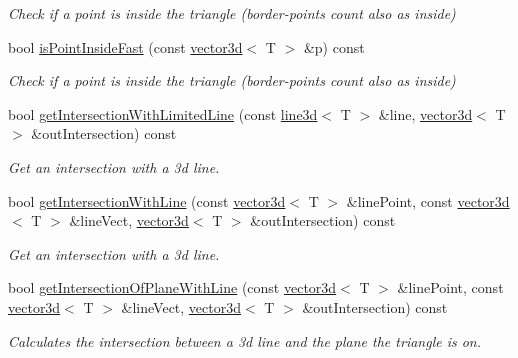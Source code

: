 \begin{DoxyCompactItemize}
\begin{DoxyCompactList}\small\item\em Check if a point is inside the triangle (border-\/points count also as inside) \end{DoxyCompactList}\item 
bool \hyperlink{classirr_1_1core_1_1triangle3d_a80986af43b5a104bef2c75f74fcf7465}{is\+Point\+Inside\+Fast} (const \hyperlink{classirr_1_1core_1_1vector3d}{vector3d}$<$ T $>$ \&p) const 
\begin{DoxyCompactList}\small\item\em Check if a point is inside the triangle (border-\/points count also as inside) \end{DoxyCompactList}\item 
bool \hyperlink{classirr_1_1core_1_1triangle3d_ab29f327aac047e9984256b11ace27318}{get\+Intersection\+With\+Limited\+Line} (const \hyperlink{classirr_1_1core_1_1line3d}{line3d}$<$ T $>$ \&line, \hyperlink{classirr_1_1core_1_1vector3d}{vector3d}$<$ T $>$ \&out\+Intersection) const 
\begin{DoxyCompactList}\small\item\em Get an intersection with a 3d line. \end{DoxyCompactList}\item 
bool \hyperlink{classirr_1_1core_1_1triangle3d_a8507e3af8385b006ca026173fad33506}{get\+Intersection\+With\+Line} (const \hyperlink{classirr_1_1core_1_1vector3d}{vector3d}$<$ T $>$ \&line\+Point, const \hyperlink{classirr_1_1core_1_1vector3d}{vector3d}$<$ T $>$ \&line\+Vect, \hyperlink{classirr_1_1core_1_1vector3d}{vector3d}$<$ T $>$ \&out\+Intersection) const 
\begin{DoxyCompactList}\small\item\em Get an intersection with a 3d line. \end{DoxyCompactList}\item 
bool \hyperlink{classirr_1_1core_1_1triangle3d_a0ac5455e0215040cc93475baa543303a}{get\+Intersection\+Of\+Plane\+With\+Line} (const \hyperlink{classirr_1_1core_1_1vector3d}{vector3d}$<$ T $>$ \&line\+Point, const \hyperlink{classirr_1_1core_1_1vector3d}{vector3d}$<$ T $>$ \&line\+Vect, \hyperlink{classirr_1_1core_1_1vector3d}{vector3d}$<$ T $>$ \&out\+Intersection) const 
\begin{DoxyCompactList}\small\item\em Calculates the intersection between a 3d line and the plane the triangle is on. \end{DoxyCompactList}\item 

\end{DoxyCompactItemize}
